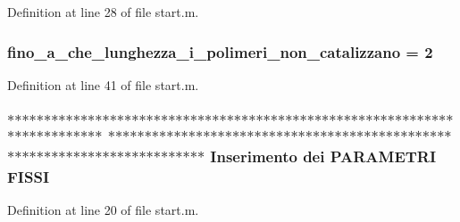 Definition at line 28 of file start.\-m.

\hypertarget{a00071_ab6966d9ee620bc7376dc41a38352b948}{
\subsubsection[{fino\-\_\-a\-\_\-che\-\_\-lunghezza\-\_\-i\-\_\-polimeri\-\_\-non\-\_\-catalizzano}]{\setlength{\rightskip}{0pt plus 5cm}fino\-\_\-a\-\_\-che\-\_\-lunghezza\-\_\-i\-\_\-polimeri\-\_\-non\-\_\-catalizzano = 2}}\label{a00071_ab6966d9ee620bc7376dc41a38352b948}


Definition at line 41 of file start.\-m.

\hypertarget{a00071_aea8a3181c0f6f0f47e51930921720484}{
\subsubsection[{F\-I\-S\-S\-I}]{\setlength{\rightskip}{0pt plus 5cm}$\ast$$\ast$$\ast$$\ast$$\ast$$\ast$$\ast$$\ast$$\ast$$\ast$$\ast$$\ast$$\ast$$\ast$$\ast$$\ast$$\ast$$\ast$$\ast$$\ast$$\ast$$\ast$$\ast$$\ast$$\ast$$\ast$$\ast$$\ast$$\ast$$\ast$$\ast$$\ast$$\ast$$\ast$$\ast$$\ast$$\ast$$\ast$$\ast$$\ast$$\ast$$\ast$$\ast$$\ast$$\ast$$\ast$$\ast$$\ast$$\ast$$\ast$$\ast$$\ast$$\ast$$\ast$$\ast$$\ast$$\ast$$\ast$$\ast$$\ast$$\ast$$\ast$$\ast$$\ast$$\ast$$\ast$$\ast$$\ast$$\ast$$\ast$$\ast$$\ast$$\ast$$\ast$ $\ast$$\ast$$\ast$$\ast$$\ast$$\ast$$\ast$$\ast$$\ast$$\ast$$\ast$$\ast$$\ast$$\ast$$\ast$$\ast$$\ast$$\ast$$\ast$$\ast$$\ast$$\ast$$\ast$$\ast$$\ast$$\ast$$\ast$$\ast$$\ast$$\ast$$\ast$$\ast$$\ast$$\ast$$\ast$$\ast$$\ast$$\ast$$\ast$$\ast$$\ast$$\ast$$\ast$$\ast$$\ast$$\ast$$\ast$$\ast$$\ast$$\ast$$\ast$$\ast$$\ast$$\ast$$\ast$$\ast$$\ast$$\ast$$\ast$$\ast$$\ast$$\ast$$\ast$$\ast$$\ast$$\ast$$\ast$$\ast$$\ast$$\ast$$\ast$$\ast$$\ast$$\ast$ Inserimento dei P\-A\-R\-A\-M\-E\-T\-R\-I F\-I\-S\-S\-I}}\label{a00071_aea8a3181c0f6f0f47e51930921720484}


Definition at line 20 of file start.\-m.

